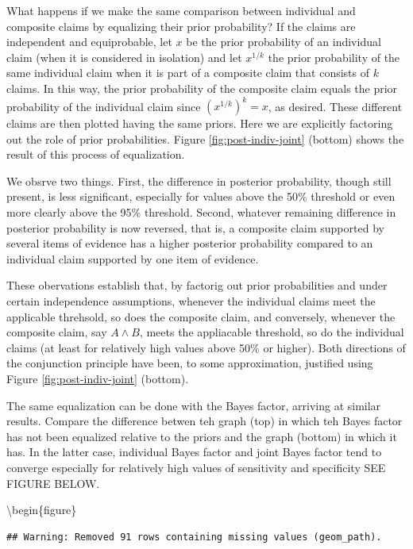\documentclass[10pt,dvipsnames,enabledeprecatedfontcommands]{scrartcl}
\begin{document}
What happens if we make the same comparison between individual and
composite claims by equalizing their prior probability? If the claims
are independent and equiprobable, let \(x\) be the prior probability of
an individual claim (when it is considered in isolation) and let
\(x^{1/k}\) the prior probability of the same individual claim when it
is part of a composite claim that consists of \(k\) claims. In this way,
the prior probability of the composite claim equals the prior
probability of the individual claim since \((x^{1/k})^k=x\), as desired.
These different claims are then plotted having the same priors. Here we
are explicitly factoring out the role of prior probabilities. Figure
\ref{fig:post-indiv-joint} (bottom) shows the result of this process of
equalization.

We obsrve two things. First, the difference in posterior probability,
though still present, is less significant, especially for values above
the 50\% threshold or even more clearly above the 95\% threshold.
Second, whatever remaining difference in posterior probability is now
reversed, that is, a composite claim supported by several items of
evidence has a higher posterior probability compared to an individual
claim supported by one item of evidence.

These obervations establish that, by factorig out prior probabilities
and under certain independence assumptions, whenever the individual
claims meet the applicable threhsold, so does the composite claim, and
conversely, whenever the composite claim, say \(A \wedge B\), meets the
appliacable threshold, so do the individual claims (at least for
relatively high values above 50\% or higher). Both directions of the
conjunction principle have been, to some approximation, justified using
Figure \ref{fig:post-indiv-joint} (bottom).

The same equalization can be done with the Bayes factor, arriving at
similar results. Compare the difference betwen teh graph (top) in which
teh Bayes factor has not been equalized relative to the priors and the
graph (bottom) in which it has. In the latter case, individual Bayes
factor and joint Bayes factor tend to converge especially for relatively
high values of sensitivity and specificity SEE FIGURE BELOW.

\textbackslash{}begin\{figure\}

\begin{verbatim}
## Warning: Removed 91 rows containing missing values (geom_path).
\end{verbatim}
\end{document}
